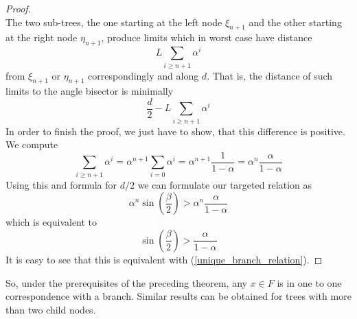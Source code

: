 \documentclass[17pt]{extarticle}
\begin{document}
\begin{proof}
$$	$$
	The two sub-trees, the one starting at the left node $\xi_{n+1}$ and the other starting at the right node $\eta_{n+1}$, produce limits which in worst case have distance 
	$$
	L\sum_{i\geq n+1}\alpha^i
	$$
	from  $\xi_{n+1}$ or $\eta_{n+1}$ correspondingly and along $d$. That is, the distance of such limits to the angle bisector is minimally 
	$$
	\frac{d}{2}-L\sum_{i\geq n+1}\alpha^i
	$$
	In order to finish the proof, we just have to show, that this difference is positive. We compute
	$$
	\sum_{i\geq n+1}\alpha^i=\alpha^{n+1}\sum_{i=0}\alpha^i=\alpha^{n+1}\frac{1}{1-\alpha}=
	\alpha^{n}\frac{\alpha}{1-\alpha}
	$$
	Using this and formula for $d/2$ we can formulate our targeted relation as
	$$
	\alpha^{n}\sin\left(\frac{\beta}{2}\right)>\alpha^n\frac{\alpha}{1-\alpha}
	$$
	which is equivalent to
	$$
	\sin\left(\frac{\beta}{2}\right)>\frac{\alpha}{1-\alpha}
	$$
	It is easy to see that this is equivalent with (\ref{unique_branch_relation}).
	
\end{proof}
So, under the prerequisites of the preceding theorem, any $x\in F$ is in one to one correspondence with a branch. Similar results can be obtained for trees with more than two child nodes.
\end{document}
